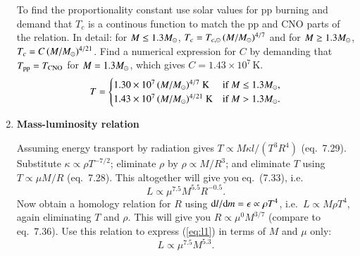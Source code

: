 \documentclass[11pt,a4paper,fleqn]{report}
\begin{document}
\begin{enumerate}
  To find the proportionality constant use solar values for pp burning
  and demand that $T_c$ is a continous function to match the pp and
  CNO parts of the relation. In detail: for $M \leq 1.3 {M}_\odot$, $T_c =
  T_{c,\odot}\, (M/{M}_\odot)^{4/7}$ and for $M \geq 1.3 {M}_\odot$, $T_c = C\,
  (M/{M}_\odot)^{4/21}$. Find a numerical expression for $C$ by demanding
  that $T_{\rm pp} = T_{\rm CNO}$ for $M = 1.3{M}_\odot$, which gives $C =
  1.43\times10^7$\,K.
  \[
  T = \begin{cases}
    1.30 \times 10^7\, (M/{M}_\odot)^{4/7}~\mathrm{K} & \text{if $M \leq 1.3 
      {M}_\odot$},\\
    1.43 \times 10^7\, (M/{M}_\odot)^{4/21}~\mathrm{K} & \text{if $M > 1.3
      {M}_\odot$}.
  \end{cases}
  \]


\item {\bf Mass-luminosity relation}

  Assuming energy transport by radiation gives $T \propto M \kappa l
  /(T^3 R^4)$ (eq.~7.29). Substitute $\kappa \propto \rho T^{-7/2}$;
  eliminate $\rho$ by $\rho \propto M/R^3$; and eliminate $T$ using $T
  \propto \mu M/R$ (eq.~7.28).  This altogether will give you
  eq.~(7.33), i.e.\
  \begin{equation}
    L \propto \mu^{7.5} M^{5.5} R^{-0.5}. \label{eq:l1}
  \end{equation}
  Now obtain a homology relation for $R$ using $\mathrm{d} l/\mathrm{d} m =
  \epsilon \propto \rho T^4$, i.e.\ $L \propto M \rho T^4$, again
  eliminating $T$ and $\rho$. This will give you $R \propto \mu^{0}
  M^{3/7}$ (compare to eq.~7.36). Use this relation to express
  (\ref{eq:l1}) in terms of $M$ and $\mu$ only:
  \[ L \propto \mu^{7.5} M^{5.3}. \]


\end{enumerate} 
\end{document}
